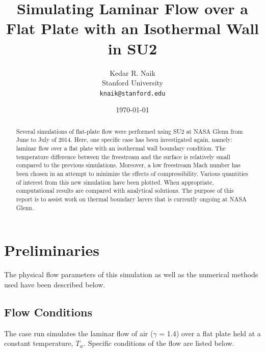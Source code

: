 \documentclass[12pt,letterpaper]{article}
\begin{document}
\title{Simulating Laminar Flow over a Flat Plate with an Isothermal Wall in SU2}
\author{Kedar R. Naik \\
 Stanford University \\
 \texttt{knaik@stanford.edu}}
\date{\today}
\maketitle

\begin{abstract}
Several simulations of flat-plate flow were performed using SU2 at NASA Glenn from June to July of 2014. Here, one specific case has been investigated again, namely: laminar flow over a flat plate with an isothermal wall boundary condition. The temperature difference between the freestream and the surface is relatively small compared to the previous simulations. Moreover, a low freestream Mach number has been chosen in an attempt to minimize the effects of compressibility. Various quantities of interest from this new simulation have been plotted. When appropriate, computational results are compared with analytical solutions. The purpose of this report is to assist work on thermal boundary layers that is currently ongoing at NASA Glenn.
\end{abstract}

\section*{Preliminaries}
The physical flow parameters of this simulation as well as the numerical methods used have been described below.

\subsection*{Flow Conditions}
The case run simulates the laminar flow of air ($\gamma$ = 1.4) over a flat plate held at a constant temperature, $T_w$. Specific conditions of the flow are listed below.
\end{document}
